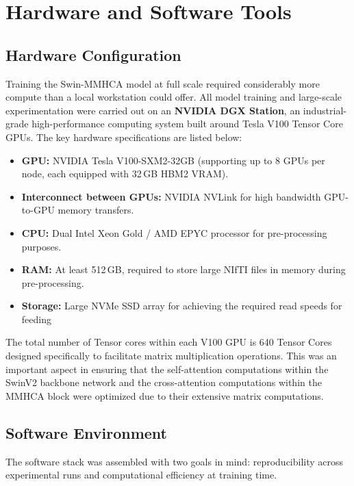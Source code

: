 \chapter{Hardware and Software Tools}

\section{Hardware Configuration}
Training the Swin-MMHCA model at full scale required considerably more compute than a local workstation could offer. All model training and large-scale experimentation were carried out on an \textbf{NVIDIA DGX Station}, an industrial-grade high-performance computing system built around Tesla V100 Tensor Core GPUs. The key hardware specifications are listed below:

\begin{itemize}
   \item \textbf{GPU:} NVIDIA Tesla V100-SXM2-32GB (supporting up to 8 GPUs per node, each equipped with 32\,GB HBM2 VRAM).
    \item \textbf{Interconnect between GPUs:} NVIDIA NVLink for high bandwidth GPU-to-GPU memory transfers.
    \item \textbf{CPU:} Dual Intel Xeon Gold / AMD EPYC processor for pre-processing purposes.
    \item \textbf{RAM:} At least 512\,GB, required to store large NIfTI files in memory during pre-processing.
    \item \textbf{Storage:} Large NVMe SSD array for achieving the required read speeds for feeding
\end{itemize}

The total number of Tensor cores within each V100 GPU is 640 Tensor Cores designed specifically to facilitate matrix multiplication operations. This was an important aspect in ensuring that the self-attention computations within the SwinV2 backbone network and the cross-attention computations within the MMHCA block were optimized due to their extensive matrix computations.

\section{Software Environment}
The software stack was assembled with two goals in mind: reproducibility across experimental runs and computational efficiency at training time.

